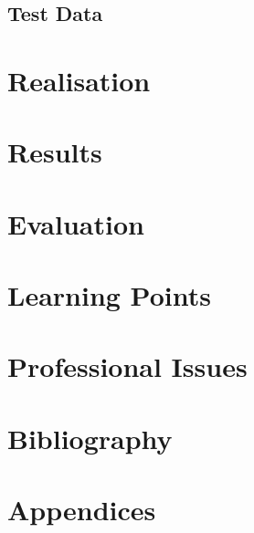 \documentclass{article}
\begin{document}
		\subsection{Test Data}
	
	\section{Realisation}
	
	\section{Results}
	
	
	
	\section{Evaluation}
	
	\section{Learning Points}
	
	\section{Professional Issues}
	
	\section{Bibliography}
	
		
		
	
	\section{Appendices}
		
\end{document}
